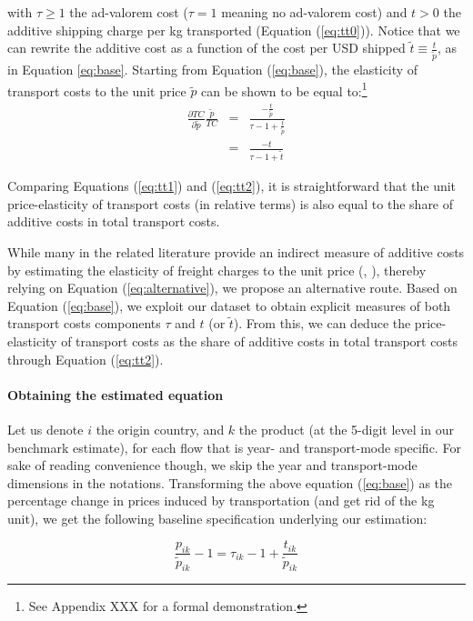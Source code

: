 \documentclass[a4paper,11pt]{article}
\begin{document}
\noindent with $\tau \geq 1$ the ad-valorem cost ($\tau =1$ meaning no ad-valorem cost) and $t>0 $ the additive shipping charge per kg transported (Equation (\ref{eq:tt0})). Notice that we can rewrite the additive cost as a function of the cost per USD shipped $\widetilde{t} \equiv \frac{t}{\widetilde{p}}$, as in Equation \ref{eq:base}. Starting from Equation (\ref{eq:base}), the elasticity of transport costs to the unit price $\widetilde{p}$ can be shown to be equal to:\footnote{See Appendix XXX for a formal demonstration.}
\begin{eqnarray}
\frac{\partial TC}{\partial \widetilde{p}} \frac{\tilde{p}}{TC}&=& \frac{-\frac{t}{\tilde{p}}}{\tau - 1  +\frac{t}{\tilde{p}}} \\
&=& \frac{-t}{\tau -1+\widetilde{t}} \label{eq:tt2}
\end{eqnarray}

Comparing Equations (\ref{eq:tt1}) and (\ref{eq:tt2}), it is straightforward that the unit price-elasticity of transport costs (in relative terms) is also equal to the share of additive costs in total transport costs.

While many in the related literature provide an indirect measure of additive costs by estimating the elasticity of freight charges to the unit price (\citealp{hummels_skiba}, \citealp{Lashkaripour-2018}), thereby relying on Equation (\ref{eq:alternative}), we propose an alternative route. Based on Equation (\ref{eq:base}), we exploit our dataset to obtain explicit measures of both transport costs components $\tau$ and $t$ (or $\widetilde{t}$). From this, we can deduce the price-elasticity of transport costs as the share of additive costs in total transport costs through Equation (\ref{eq:tt2}).



\paragraph{Obtaining the estimated equation} Let us denote $i$ the origin country, and $k$ the product (at the 5-digit level in our benchmark estimate), for each flow that is year- and transport-mode specific. For sake of reading convenience though, we skip the year and transport-mode dimensions in the notations. Transforming the above equation (\ref{eq:base}) as the percentage change in prices induced by transportation (and get rid of the kg unit), we get the following baseline specification underlying our estimation:

\begin{equation}
\frac{p_{ik}}{\widetilde{p}_{ik}} -1 = \tau_{ik} -1 +\frac{t_{ik}}{ \widetilde{p}_{ik}} \label{eq:base_estimee}
\end{equation}
\end{document}
